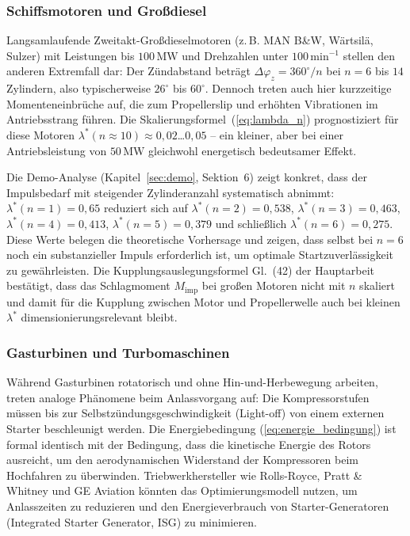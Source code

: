﻿\documentclass[a4paper,12pt]{article}
\begin{document}
\subsubsection{Schiffsmotoren und Großdiesel}

Langsamlaufende Zweitakt-Großdieselmotoren (z.\,B. MAN B\&W, Wärtsilä,
Sulzer) mit Leistungen bis $100\,\text{MW}$ und Drehzahlen unter
$100\,\text{min}^{-1}$ stellen den anderen Extremfall dar:
Der Zündabstand beträgt $\Delta\varphi_z = 360^\circ/n$ bei $n = 6$
bis $14$ Zylindern, also typischerweise $26^\circ$ bis $60^\circ$.
Dennoch treten auch hier kurzzeitige Momenteneinbrüche auf, die
zum \glqq Propellerslip\grqq{} und erhöhten Vibrationen im Antriebsstrang
führen. Die Skalierungsformel~(\ref{eq:lambda_n}) prognostiziert für
diese Motoren $\lambda^*(n\approx 10) \approx 0{,}02$\ldots$0{,}05$ --
ein kleiner, aber bei einer Antriebsleistung von $50\,\text{MW}$
gleichwohl energetisch bedeutsamer Effekt.

Die Demo-Analyse (Kapitel~\ref{sec:demo}, Sektion~6) zeigt konkret,
dass der Impulsbedarf mit steigender Zylinderanzahl systematisch abnimmt:
$\lambda^*(n=1) = 0{,}65$ reduziert sich auf $\lambda^*(n=2) = 0{,}538$,
$\lambda^*(n=3) = 0{,}463$, $\lambda^*(n=4) = 0{,}413$,
$\lambda^*(n=5) = 0{,}379$ und schließlich $\lambda^*(n=6) = 0{,}275$.
Diese Werte belegen die theoretische Vorhersage und zeigen, dass selbst
bei $n=6$ noch ein substanzieller Impuls erforderlich ist, um optimale
Startzuverlässigkeit zu gewährleisten. Die Kupplungsauslegungsformel
Gl.~(42) der Hauptarbeit bestätigt, dass das Schlagmoment $M_\text{imp}$
bei großen Motoren nicht mit $n$ skaliert und damit für die
Kupplung zwischen Motor und Propellerwelle auch bei kleinen $\lambda^*$
dimensionierungsrelevant bleibt.

\subsubsection{Gasturbinen und Turbomaschinen}

Während Gasturbinen rotatorisch und ohne Hin-und-Herbewegung arbeiten,
treten analoge Phänomene beim Anlassvorgang auf: Die Kompressorstufen
müssen bis zur Selbstzündungsgeschwindigkeit (\glqq Light-off\grqq{})
von einem externen Starter beschleunigt werden. Die Energiebedingung
(\ref{eq:energie_bedingung}) ist formal identisch mit der
Bedingung, dass die kinetische Energie des Rotors ausreicht, um
den aerodynamischen Widerstand der Kompressoren beim Hochfahren zu
überwinden. Triebwerkhersteller wie Rolls-Royce, Pratt \& Whitney
und GE Aviation könnten das Optimierungsmodell nutzen, um
Anlasszeiten zu reduzieren und den Energieverbrauch von Starter-Generatoren
(Integrated Starter Generator, ISG) zu minimieren.
\end{document}
